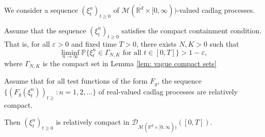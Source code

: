 \begin{lemma}
We consider a sequence $(\xi^n_t)_{t\geq 0}$ of $\mathcal{M}(\overline{\mathbb{R}^d} \times [0,\infty))$-valued cadlag processes.

Assume that the sequence $(\xi^n_t)_{t\geq 0}$ satisfies the compact containment condition. That is,
for all $\varepsilon > 0$ and fixed time $T > 0$, there exists $N, K> 0$ such that 
\begin{equation}
\liminf_{n \to \infty} \mathbb{P}\{ \xi^n_t \in \Gamma_{N,K} \text{ for all } t\in [0,T]\} > 1-\varepsilon,
\end{equation}
where $\Gamma_{N,K}$ is the compact set in Lemma \ref{lem: vague compact sets}

Assume that for all test functions of the form $F_g$,
the sequence $\{(F_g(\xi^n_t))_{t \geq}: n=1,2,...\}$ of real-valued cadlag processes are relatively compact. 

Then  $(\xi^n_t )_{t\geq 0}$ is relatively compact in $\mathcal{D}_{\mathcal{M}(\overline{\mathbb{R}^d} \times[0,\infty))}([0,T])$.
\end{lemma}


